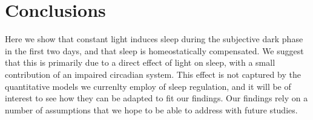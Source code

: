 \section{Conclusions}
Here we show that constant light induces sleep during the subjective 
dark phase in the first two days, and that sleep is homeostatically
compensated.
We suggest that this is primarily due to a direct effect of light on 
sleep, with a small contribution of an impaired circadian system. 
This effect is not captured by the quantitative models we currenlty
employ of sleep regulation, and it will be of interest to see 
how they can be adapted to fit our findings.
Our findings rely on a number of assumptions that we hope to be able to address
with future studies.




